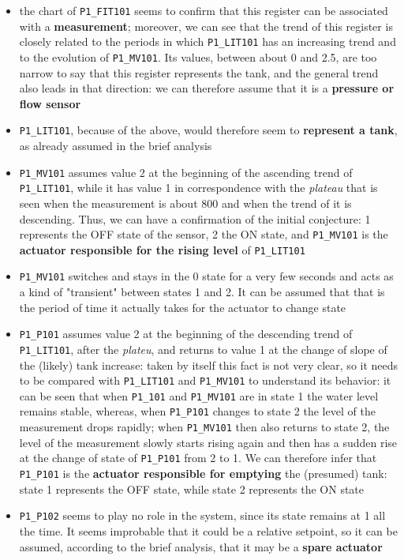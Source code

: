 \begin{itemize}
	\item the chart of \texttt{P1\_FIT101} seems to confirm that this register can be associated with a \textbf{measurement}; moreover, we can see that the trend of this register is closely related to the periods in which \texttt{P1\_LIT101} has an increasing trend and to the evolution of \texttt{P1\_MV101}. Its values, between about 0 and 2.5, are too narrow to say that this register represents the tank, and the general trend also leads in that direction: we can therefore assume that it is a \textbf{pressure or flow sensor}
	
	\item \texttt{P1\_LIT101}, because of the above, would therefore seem to \textbf{represent a tank}, as already assumed in the brief analysis
	
	\item \texttt{P1\_MV101} assumes value 2 at the beginning of the ascending trend of \texttt{P1\_LIT101}, while it has value 1 in correspondence with the \textit{plateau} that is seen when the measurement is about 800 and when the trend of it is descending. Thus, we can have a confirmation of the initial conjecture: 1 represents the OFF state of the sensor, 2 the ON state, and \texttt{P1\_MV101} is the \textbf{actuator responsible for the rising level} of \texttt{P1\_LIT101}
	
	\item \texttt{P1\_MV101} switches and stays in the 0 state for a very few seconds and acts as a kind of "transient" between states 1 and 2. It can be assumed that that is the period of time it actually takes for the actuator to change state
	
	\item \texttt{P1\_P101} assumes value 2 at the beginning of the descending trend of \texttt{P1\_LIT101}, after the \textit{plateu}, and returns to value 1 at the change of slope of the (likely) tank increase: taken by itself this fact is not very clear, so it needs to be compared with \texttt{P1\_LIT101} and \texttt{P1\_MV101} to understand its behavior: it can be seen that when \texttt{P1\_101} and \texttt{P1\_MV101} are in state 1 the water level remains stable, whereas, when \texttt{P1\_P101} changes to state 2 the level of the measurement drops rapidly; when \texttt{P1\_MV101} then also returns to state 2, the level of the measurement slowly starts rising again and then has a sudden rise at the change of state of \texttt{P1\_P101} from 2 to 1. We can therefore infer that \texttt{P1\_P101} is the \textbf{actuator responsible for emptying} the (presumed) tank: state 1 represents the OFF state, while state 2 represents the ON state
	
	\item \texttt{P1\_P102} seems to play no role in the system, since its state remains at 1 all the time. It seems improbable that it could be a relative setpoint, so it can be assumed, according to the brief analysis, that it may be a \textbf{spare actuator}
\end{itemize}

